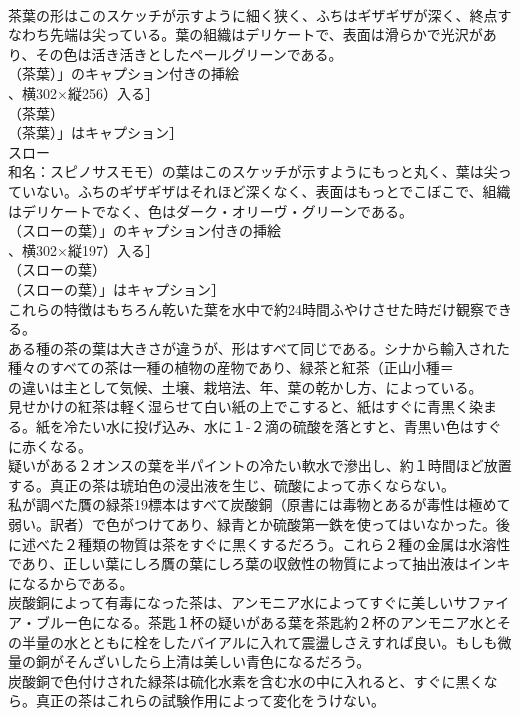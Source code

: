 \documentclass[8pt]{extreport}
\begin{document}
\begin{CJK}{UTF8}{min}
\\	茶葉の形はこのスケッチが示すように細く狭く、ふちはギザギザが深く、終点すなわち先端は尖っている。葉の組織はデリケートで、表面は滑らかで光沢があり、その色は活き活きとしたペールグリーンである。
\\	（茶葉）」のキャプション付きの挿絵
\\	、横302×縦256）入る］
\\	（茶葉）
\\	（茶葉）」はキャプション］
\\	スロー
\\	和名：スピノサスモモ）の葉はこのスケッチが示すようにもっと丸く、葉は尖っていない。ふちのギザギザはそれほど深くなく、表面はもっとでこぼこで、組織はデリケートでなく、色はダーク・オリーヴ・グリーンである。
\\	（スローの葉）」のキャプション付きの挿絵
\\	、横302×縦197）入る］
\\	（スローの葉）
\\	（スローの葉）」はキャプション］
\\	これらの特徴はもちろん乾いた葉を水中で約24時間ふやけさせた時だけ観察できる。
\\	ある種の茶の葉は大きさが違うが、形はすべて同じである。シナから輸入された種々のすべての茶は一種の植物の産物であり、緑茶と紅茶（正山小種＝
\\	の違いは主として気候、土壌、栽培法、年、葉の乾かし方、によっている。
\\	見せかけの紅茶は軽く湿らせて白い紙の上でこすると、紙はすぐに青黒く染まる。紙を冷たい水に投げ込み、水に１-２滴の硫酸を落とすと、青黒い色はすぐに赤くなる。
\\	疑いがある２オンスの葉を半パイントの冷たい軟水で滲出し、約１時間ほど放置する。真正の茶は琥珀色の浸出液を生じ、硫酸によって赤くならない。
\\	私が調べた贋の緑茶19標本はすべて炭酸銅（原書には毒物とあるが毒性は極めて弱い。訳者）で色がつけてあり、緑青とか硫酸第一鉄を使ってはいなかった。後に述べた２種類の物質は茶をすぐに黒くするだろう。これら２種の金属は水溶性であり、正しい葉にしろ贋の葉にしろ葉の収斂性の物質によって抽出液はインキになるからである。
\\	炭酸銅によって有毒になった茶は、アンモニア水によってすぐに美しいサファイア・ブルー色になる。茶匙１杯の疑いがある葉を茶匙約２杯のアンモニア水とその半量の水とともに栓をしたバイアルに入れて震盪しさえすれば良い。もしも微量の銅がそんざいしたら上清は美しい青色になるだろう。
\\	炭酸銅で色付けされた緑茶は硫化水素を含む水の中に入れると、すぐに黒くなら。真正の茶はこれらの試験作用によって変化をうけない。

\end{CJK}
\end{document}
